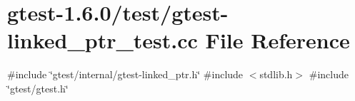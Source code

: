 \hypertarget{gtest-linked__ptr__test_8cc}{\section{gtest-\/1.6.0/test/gtest-\/linked\-\_\-ptr\-\_\-test.cc \-File \-Reference}
\label{d9/dc5/gtest-linked__ptr__test_8cc}
}
{\ttfamily \#include \char`\"{}gtest/internal/gtest-\/linked\-\_\-ptr.\-h\char`\"{}}\*
{\ttfamily \#include $<$stdlib.\-h$>$}\*
{\ttfamily \#include \char`\"{}gtest/gtest.\-h\char`\"{}}\*
